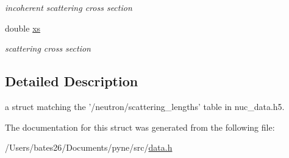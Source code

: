 \begin{DoxyCompactItemize}
\begin{DoxyCompactList}\small\item\em incoherent scattering cross section \end{DoxyCompactList}\item 
\hypertarget{structpyne_1_1scattering__lengths_aaaab6ef13d13f4058b263f0d28da9ac3}{double \hyperlink{structpyne_1_1scattering__lengths_aaaab6ef13d13f4058b263f0d28da9ac3}{xs}}\label{structpyne_1_1scattering__lengths_aaaab6ef13d13f4058b263f0d28da9ac3}

\begin{DoxyCompactList}\small\item\em scattering cross section \end{DoxyCompactList}\end{DoxyCompactItemize}


\subsection{Detailed Description}
a struct matching the '/neutron/scattering\+\_\+lengths' table in nuc\+\_\+data.\+h5. 

The documentation for this struct was generated from the following file\+:\begin{DoxyCompactItemize}
\item 
/\+Users/bates26/\+Documents/pyne/src/\hyperlink{data_8h}{data.\+h}\end{DoxyCompactItemize}
